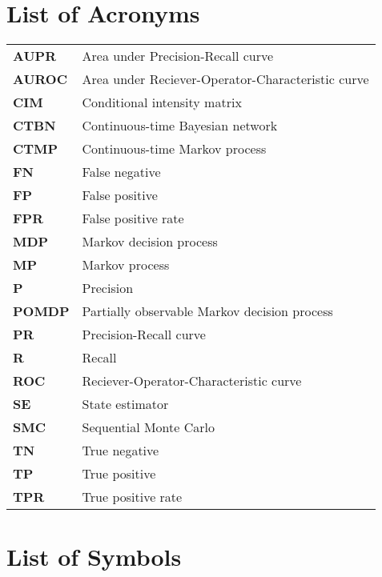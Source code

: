 \chapter*{List of Acronyms}
\begin{tabular}{p{} p{}}
	\textbf{AUPR} & Area under Precision-Recall curve \\
	\textbf{AUROC} & Area under Reciever-Operator-Characteristic curve \\
	\textbf{CIM} & Conditional intensity matrix \\
	\textbf{CTBN} & Continuous-time Bayesian network \\
	\textbf{CTMP} & Continuous-time Markov process \\
	\textbf{FN} & False negative\\
	\textbf{FP} & False positive\\
	\textbf{FPR} & False positive rate\\
	\textbf{MDP} & Markov decision process \\
	\textbf{MP} & Markov process\\
	\textbf{P} & Precision\\
	\textbf{POMDP} & Partially observable Markov decision process\\
	\textbf{PR} & Precision-Recall curve \\
	\textbf{R} & Recall\\
	\textbf{ROC} & Reciever-Operator-Characteristic curve \\
	\textbf{SE} & State estimator\\
	\textbf{SMC} & Sequential Monte Carlo\\
	\textbf{TN} & True negative\\
	\textbf{TP} & True positive\\
	\textbf{TPR} & True positive rate\\
\end{tabular}

\chapter*{List of Symbols}

